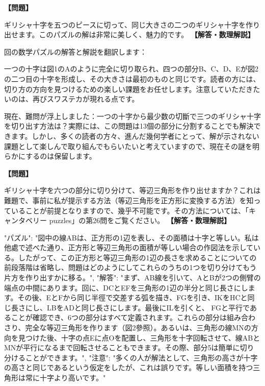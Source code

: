\documentclass[10pt,a4paper,oneside,openany]{ltjsbook}
\begin{document}
\begin{tcolorbox}[colback=softblue,colframe=primaryblue,title=\textbf{第 143 問：TWO CROSSES FROM ONE.},arc=2mm,boxrule=1pt,breakable]
\textbf{【問題】}\par\vspace{0.3em}
ギリシャ十字を五つのピースに切って、同じ大きさの二つのギリシャ十字を作り出せます。このパズルの解は非常に美しく、魅力的です。
\tcblower
\textbf{【解答・数理解説】}\par\vspace{0.3em}
回の数学パズルの解答と解説を翻訳します：

一つの十字は図1のAのように完全に切り取られ、四つの部分B、C、D、Eが図2の二つ目の十字を形成し、その大きさは最初のものと同じです。読者の方には、切り方の方向を見つけるための楽しい課題をお任せします。注意していただきたいのは、再びスワステカが現れる点です。

現在、難問が浮上しました：一つの十字から最少数の切斷で三つのギリシャ十字を切り出す方法は？実際には、この問題は13個の部分に分割することでも解決できます。しかし、多くの読者の方々、進んだ幾何学者にとって、解が示されない課題として楽しんで取り組んでもらいたいと考えていますので、現在その謎を明らかにするのは保留します。
\end{tcolorbox}

\begin{tcolorbox}[colback=softblue,colframe=primaryblue,title=\textbf{第 144 問：THE CROSS AND THE TRIANGLE.},arc=2mm,boxrule=1pt,breakable]
\textbf{【問題】}\par\vspace{0.3em}
ギリシャ十字を六つの部分に切り分けて、等辺三角形を作り出せますか？これは難題で、事前に私が提示する方法（等辺三角形を正方形に変換する方法）を知っていることが前提となりますので、幾乎不可能です。その方法については、「キャンタベリー puzzles」の第26問をご覧ください。
\tcblower
\textbf{【解答・数理解説】}\par\vspace{0.3em}
{
"パズル": "図中の線ABは、正方形の1辺を表し、その面積は十字と等しい。私は他處で述べた通り、正方形と等辺三角形の面積が等しい場合の作図法を示している。したがって、この正方形と等辺三角形の1辺の長さを求めることについての前段落階は省略し、問題はどのようにしてこれらのうちの1つを切り分けてもう片方を作り出すかに移る。",
"解答": "まず、AB線を引いて、AとBが2つの側臂の端点の中間にあります。回に、DCとEFを三角形の1辺の半分と同じ長さにします。その後、EとFから同じ半徑で交差する弧を描き、FGを引き、IKをHCと同じ長さにし、LBをADと同じ長さにします。最後にILを引くと、 FGと平行であることが確認でき、6つの部分はすべて定義されます。これらの部分は組み合わさり、完全な等辺三角形を作ります（図2參照）。あるいは、三角形の線MNの方向を見つけた後、十字の点Eに点Oを配置し、三角形を十字回転させて、線ABとMNが平行になるまで回転させることもできます。その際、部分5は簡単に切り分けることができます。",
"注意": "多くの人が解法として、三角形の高さが十字の高さと同じであるという仮定をしたが、これは誤りです。等しい面積を持つ三角形は常に十字より高いです。"
}
\end{tcolorbox}
\end{document}
